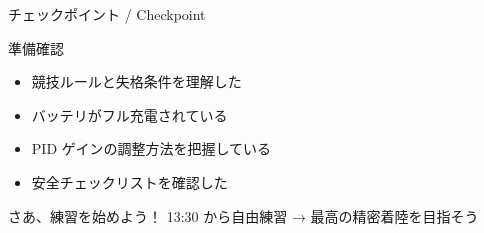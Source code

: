 \begin{frame}{チェックポイント / Checkpoint}
  \begin{alertblock}{準備確認}
    \begin{itemize}
      \item[$\square$] 競技ルールと失格条件を理解した
      \item[$\square$] バッテリがフル充電されている
      \item[$\square$] PID ゲインの調整方法を把握している
      \item[$\square$] 安全チェックリストを確認した
    \end{itemize}
  \end{alertblock}

  \vspace{1em}

  \begin{block}{さあ、練習を始めよう！}
    13:30 から自由練習 → 最高の精密着陸を目指そう
  \end{block}
\end{frame}
